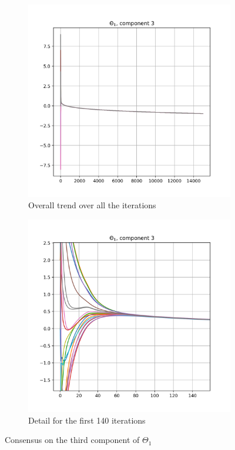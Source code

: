 \documentclass[a4paper,11pt,oneside]{book}
\begin{document}
\begin{figure}[ht]
	\centering
	\begin{subfigure}{.5\textwidth}
		\centering
		\includegraphics[scale=.4]{figs/theta_1_3_overall}
		\caption{Overall trend over all the iterations}
		\label{avg_consensus:overall}
	\end{subfigure}%
	\begin{subfigure}{.5\textwidth}
		\centering
		\includegraphics[scale=.4]{figs/theta_1_3_detail}
		\caption{Detail for the first 140 iterations}
		\label{avg_consensus:detail}
	\end{subfigure}
	\caption{Consensus on the third component of $\Theta_1$}
	\label{avg_consensus}
\end{figure}
\end{document}
